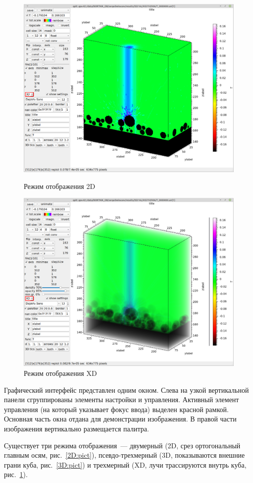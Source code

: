 \documentclass[12pt]{article}
\begin{document}
\begin{figure}
  \begin{center}
      \includegraphics[width=.7\textwidth]{picts/3D.png} 
  \end{center}
  \caption{Режим отображения 2D}\label{3D:pict}
  \begin{center}
      \includegraphics[width=.7\textwidth]{picts/XD.png} 
  \end{center}
  \caption{Режим отображения XD}\label{XD:pict}
\end{figure}
Графический интерфейс представлен одним окном. Слева на узкой вертикальной панели сгруппированы элементы настройки и управления.
Активный элемент управления (на который указывает фокус ввода) выделен красной рамкой.
Основная часть окна отдана для демонстрации изображения. В правой части изображения вертикально размещается палитра. 

Существует три режима отображения~--- двумерный (2D, срез ортогональный главным осям, рис.~\ref{2D:pict}), псевдо-трехмерный (3D, показываются внешние грани куба, рис.~\ref{3D:pict})
и трехмерный (XD, лучи трассируются внутрь куба, рис.~\ref{XD:pict}).
\end{document}
